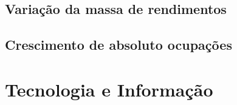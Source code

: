 \documentclass[8pt]{beamer}
\begin{document}
\subsection{Variação da massa de rendimentos}

\begin{frame}
\textit{\hyperlink{indice_principal_amz_floresta}{}}

\end{frame}

\begin{frame}
\textit{\hyperlink{indice_principal_amz_floresta}{}}

\end{frame}

\subsection{Crescimento de absoluto ocupações}

\begin{frame}
\textit{\hyperlink{indice_principal_amz_floresta}{}}

\end{frame}

\begin{frame}
\textit{\hyperlink{indice_principal_amz_floresta}{}}

\end{frame}

\section{Tecnologia e Informação}
\end{document}
